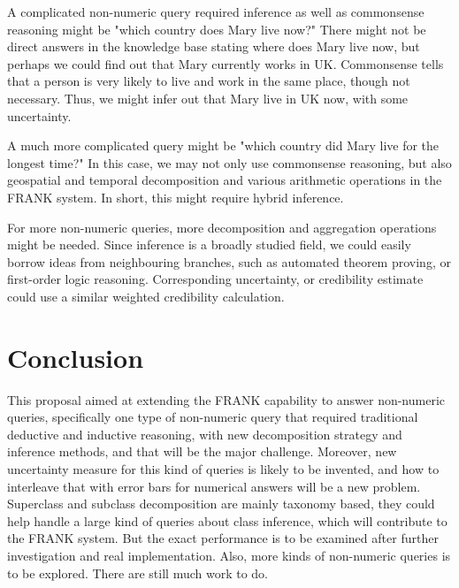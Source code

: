 \documentclass[12pt]{extarticle}
\begin{document}
A complicated non-numeric query required inference as well as commonsense reasoning might be "which country does Mary live now?" There might not be direct answers in the knowledge base stating where does Mary live now, but perhaps we could find out that Mary currently works in UK. Commonsense tells that a person is very likely to live and work in the same place, though not necessary. Thus, we might infer out that Mary live in UK now, with some uncertainty. 

A much more complicated query might be "which country did Mary live for the longest time?" In this case, we may not only use commonsense reasoning, but also geospatial and temporal decomposition and various arithmetic operations in the FRANK system. In short, this might require hybrid inference.

For more non-numeric queries, more decomposition and aggregation operations might be needed. Since inference is a broadly studied field, we could easily borrow ideas from neighbouring branches, such as automated theorem proving\cite{bibel2013automated}, or first-order logic reasoning\cite{fitting2012first}. Corresponding uncertainty, or credibility estimate could use a similar weighted credibility calculation.


\section{Conclusion}
This proposal aimed at extending the FRANK capability to answer non-numeric queries, specifically one type of non-numeric query that required traditional deductive and inductive reasoning, with new decomposition strategy and inference methods, and that will be the major challenge. Moreover, new uncertainty measure for this kind of queries is likely to be  invented, and how to interleave that with error bars for numerical answers will be a new problem. Superclass and subclass decomposition are mainly taxonomy based, they could help handle a large kind of queries about class inference, which will contribute to the FRANK system. But the exact  performance is to be examined after further investigation and real implementation. Also, more kinds of non-numeric queries is to be explored. There are still much work to do.





\end{document}
